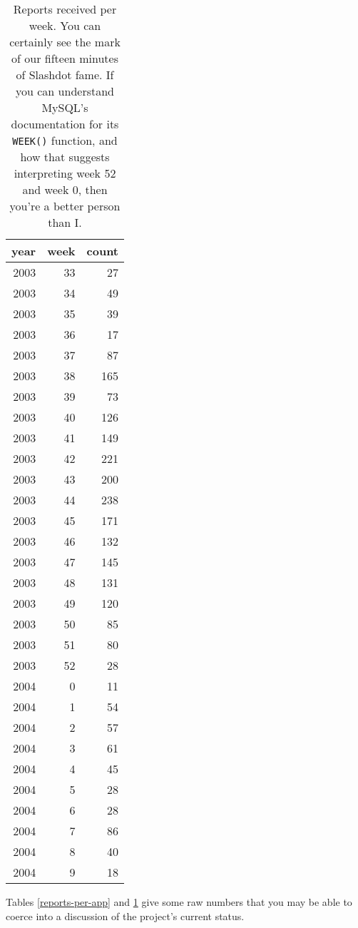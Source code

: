 \documentclass[times,10pt,twocolumn]{article}
\begin{document}
\begin{table}
  \centering
  \begin{tabular}{rrr}
    year & week & count \\ \hline
    2003 & 33 & 27 \\
    2003 & 34 & 49 \\
    2003 & 35 & 39 \\
    2003 & 36 & 17 \\
    2003 & 37 & 87 \\
    2003 & 38 & 165 \\
    2003 & 39 & 73 \\
    2003 & 40 & 126 \\
    2003 & 41 & 149 \\
    2003 & 42 & 221 \\
    2003 & 43 & 200 \\
    2003 & 44 & 238 \\
    2003 & 45 & 171 \\
    2003 & 46 & 132 \\
    2003 & 47 & 145 \\
    2003 & 48 & 131 \\
    2003 & 49 & 120 \\
    2003 & 50 & 85 \\
    2003 & 51 & 80 \\
    2003 & 52 & 28 \\
    2004 & 0 & 11 \\
    2004 & 1 & 54 \\
    2004 & 2 & 57 \\
    2004 & 3 & 61 \\
    2004 & 4 & 45 \\
    2004 & 5 & 28 \\
    2004 & 6 & 28 \\
    2004 & 7 & 86 \\
    2004 & 8 & 40 \\
    2004 & 9 & 18
  \end{tabular}
  \caption{Reports received per week.  You can certainly see the mark
    of our fifteen minutes of Slashdot fame.  If you can understand
    MySQL's documentation for its \texttt{WEEK()} function, and how
    that suggests interpreting week 52 and week 0, then you're a
    better person than I.}
  \label{reports-per-week}
\end{table}

Tables \ref{reports-per-app} and \ref{reports-per-week} give some raw
numbers that you may be able to coerce into a discussion of the
project's current status.
\end{document}
